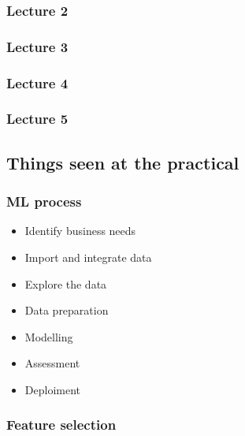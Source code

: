 \subsubsection{Lecture 2}
\subsubsection{Lecture 3}
\subsubsection{Lecture 4}
\subsubsection{Lecture 5}

\subsection{Things seen at the practical}

\subsubsection{ML process}

\begin{itemize}
    \item Identify business needs
    \item Import and integrate data
    \item Explore the data
    \item Data preparation
    \item Modelling
    \item Assessment
    \item Deploiment
\end{itemize}


\subsubsection{Feature selection}

